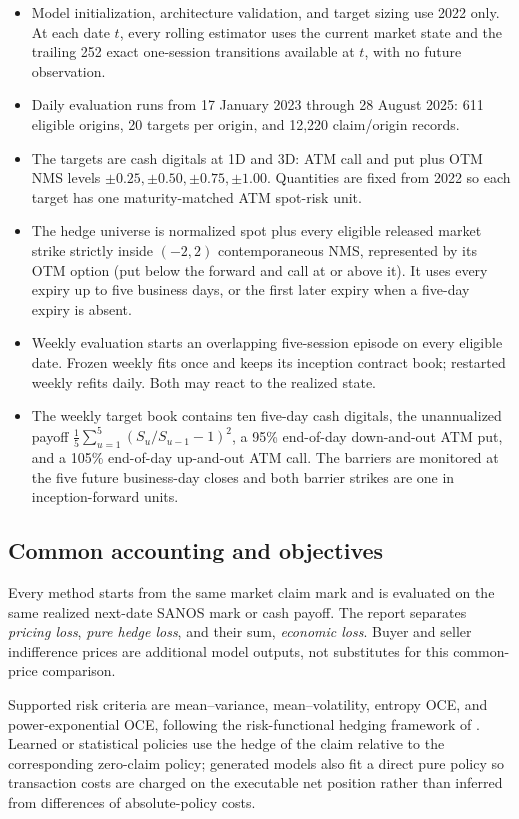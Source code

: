 \documentclass[10pt]{article}
\begin{document}
\begin{itemize}
  \item Model initialization, architecture validation, and target sizing use
  2022 only. At each date $t$, every rolling estimator uses the current market
  state and the trailing 252 exact one-session transitions available at $t$,
  with no future observation.
  \item Daily evaluation runs from 17 January 2023 through 28 August 2025:
  611 eligible origins, 20 targets per origin, and 12,220 claim/origin records.
  \item The targets are cash digitals at 1D and 3D: ATM call and put plus OTM
  NMS levels $\pm0.25,\pm0.50,\pm0.75,\pm1.00$. Quantities are fixed from
  2022 so each target has one maturity-matched ATM spot-risk unit.
  \item The hedge universe is normalized spot plus every eligible released
  market strike strictly inside $(-2,2)$ contemporaneous NMS, represented by
  its OTM option (put below the forward and call at or above it). It uses every
  expiry up to five business days, or the first later expiry when a five-day
  expiry is absent.
  \item Weekly evaluation starts an overlapping five-session episode on every
  eligible date. Frozen weekly fits once and keeps its inception contract book;
  restarted weekly refits daily. Both may react to the realized state.
  \item The weekly target book contains ten five-day cash digitals, the
  unannualized payoff
  $\frac15\sum_{u=1}^5(S_u/S_{u-1}-1)^2$, a 95\% end-of-day down-and-out ATM
  put, and a 105\% end-of-day up-and-out ATM call. The barriers are monitored
  at the five future business-day closes and both barrier strikes are one in
  inception-forward units.
\end{itemize}

\subsection{Common accounting and objectives}

Every method starts from the same market claim mark and is evaluated on the
same realized next-date SANOS mark or cash payoff. The report separates
\emph{pricing loss}, \emph{pure hedge loss}, and their sum, \emph{economic
loss}. Buyer and seller indifference prices are additional model outputs, not
substitutes for this common-price comparison.

Supported risk criteria are mean--variance, mean--volatility, entropy OCE, and
power-exponential OCE, following the risk-functional hedging framework of
\citet{BuehlerEtAl2019DeepHedging}. Learned or statistical policies use the hedge of the
claim relative to the corresponding zero-claim policy; generated models also
fit a direct pure policy so transaction costs are charged on the executable
net position rather than inferred from differences of absolute-policy costs.
\end{document}

